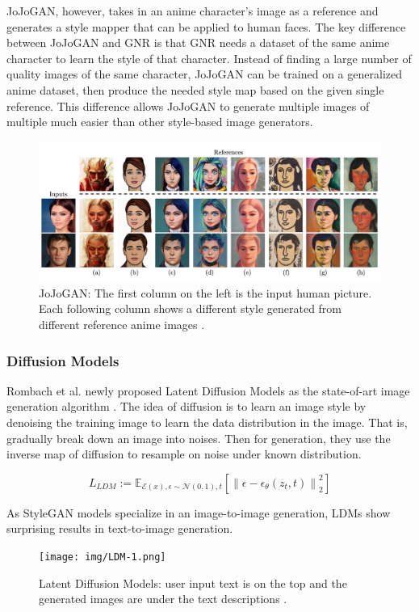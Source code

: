 JoJoGAN, however, takes in an anime character's image as a reference and generates
a style mapper that can be applied to human faces.
The key difference between JoJoGAN and GNR is that GNR needs a dataset of the same anime character to learn the style of that character.
Instead of finding a large number of quality images of the same character,
JoJoGAN can be trained on a generalized anime dataset,
then produce the needed style map based on the given single reference.
This difference allows JoJoGAN to generate multiple images of multiple much easier than other style-based image generators.
\begin{figure}[h]
    \includegraphics[width=\textwidth]{img/JoJo-1.png}
    \caption{
        JoJoGAN: The first column on the left is the input human picture.
        Each following column shows a different style generated from different reference anime images \cite{chong2021jojogan}.
    }
\end{figure}

\subsubsection*{Diffusion Models}

Rombach et al. newly proposed Latent Diffusion Models as the state-of-art image generation algorithm \cite{Rombach2022High}.
The idea of diffusion is to learn an image style by denoising the training image to learn the data distribution in the image.
That is, gradually break down an image into noises.
Then for generation, they use the inverse map of diffusion to resample on noise under known distribution.

$$
L_{L D M}:=\mathbb{E}_{\mathcal{E}(x), \epsilon \sim \mathcal{N}(0,1), t}\left[\left\|\epsilon-\epsilon_\theta\left(z_t, t\right)\right\|_2^2\right]
$$

As StyleGAN models specialize in an image-to-image generation,
LDMs show surprising results in text-to-image generation.
\begin{figure}[h]
    \texttt{[image: img/LDM-1.png]}
    \caption{
        Latent Diffusion Models:
        user input text is on the top
        and the generated images are under the text descriptions \cite{Rombach2022High}.
    }
\end{figure}

